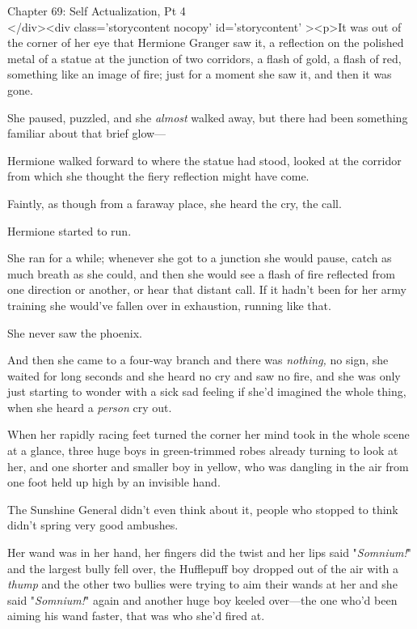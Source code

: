 
Chapter 69: Self Actualization, Pt 4\\
</div><div  class='storycontent nocopy' id='storycontent' ><p>It was out of the 
corner of her eye that Hermione Granger saw it, a reflection on the polished 
metal of a statue at the junction of two corridors, a flash of gold, a flash of 
red, something like an image of fire; just for a moment she saw it, and then it 
was gone.

She paused, puzzled, and she \emph{almost} walked away, but there had been 
something familiar about that brief glow---

Hermione walked forward to where the statue had stood, looked at the corridor 
from which she thought the fiery reflection might have come.

Faintly, as though from a faraway place, she heard the cry, the call.

Hermione started to run.

She ran for a while; whenever she got to a junction she would pause, catch as 
much breath as she could, and then she would see a flash of fire reflected from 
one direction or another, or hear that distant call. If it hadn't been for her 
army training she would've fallen over in exhaustion, running like that.

She never saw the phoenix.

And then she came to a four-way branch and there was \emph{nothing,} no sign, 
she waited for long seconds and she heard no cry and saw no fire, and she was 
only just starting to wonder with a sick sad feeling if she'd imagined the 
whole thing, when she heard a \emph{person} cry out.

When her rapidly racing feet turned the corner her mind took in the whole scene 
at a glance, three huge boys in green-trimmed robes already turning to look at 
her, and one shorter and smaller boy in yellow, who was dangling in the air 
from one foot held up high by an invisible hand.

The Sunshine General didn't even think about it, people who stopped to think 
didn't spring very good ambushes.

Her wand was in her hand, her fingers did the twist and her lips said 
"\emph{Somnium!}" and the largest bully fell over, the Hufflepuff boy dropped 
out of the air with a \emph{thump} and the other two bullies were trying to aim 
their wands at her and she said "\emph{Somnium!}" again and another huge boy 
keeled over---the one who'd been aiming his wand faster, that was who she'd 
fired at.

